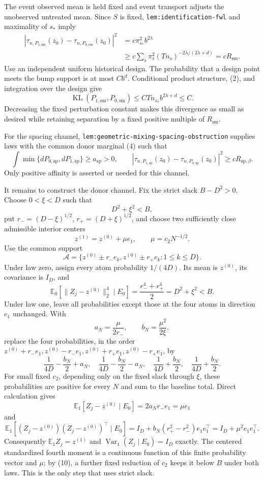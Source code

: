 The event observed mean is held fixed and event transport adjusts the unobserved untreated mean.  Since \(S\) is fixed, \texttt{lem:identification-fwl} and maximality of \(s_*\) imply
\[
\begin{aligned}
\left|\tau_{n,P_{1,\mathrm{sm}}}(z_0)-
\tau_{n,P_{0,\mathrm{sm}}}(z_0)\right|^2
&=c\pi_{s_*}^2b^{2\lambda}\\
&\geq c\sum_s\pi_s^2(Tn_s)^{-2\lambda/(2\lambda+d)}
=cR_{\mathrm{sm}}.
\end{aligned}
\tag{7}
\]
Use an independent uniform historical design.  The probability that a design point meets the bump support is at most \(Cb^d\).  Conditional product structure, (2), and integration over the design give
\[
\operatorname{KL}(P_{1,\mathrm{sm}},P_{0,\mathrm{sm}})
\leq CTn_{s_*}b^{2\lambda+d}\leq C.
\tag{8}
\]
Decreasing the fixed perturbation constant makes this divergence as small as desired while retaining separation by a fixed positive multiple of \(R_{\mathrm{sm}}\).

For the spacing channel, \texttt{lem:geometric-mixing-spacing-obstruction} supplies laws with the common donor marginal (4) such that
\[
\int\min\{dP_{0,\mathrm{sp}},dP_{1,\mathrm{sp}}\}
\geq a_{\mathrm{sp}}>0,
\qquad
\left|\tau_{n,P_{1,\mathrm{sp}}}(z_0)-
\tau_{n,P_{0,\mathrm{sp}}}(z_0)\right|^2
\geq cR_{\mathrm{sp},\beta}.
\tag{9}
\]
Only positive affinity is asserted or needed for this channel.

It remains to construct the donor channel.  Fix the strict slack \(B-D^2>0\).  Choose \(0<\xi<D\) such that
\[
D^2+\xi^2<B,
\]
put \(r_-=(D-\xi)^{1/2}\), \(r_+=(D+\xi)^{1/2}\), and choose two sufficiently close admissible interior centers
\[
z^{(1)}=z^{(0)}+\mu e_1,
\qquad
\mu=c_2N^{-1/2}.
\]
Use the common support
\[
\mathcal A=\{z^{(0)}\pm r_-e_k, z^{(0)}\pm r_+e_k:1\leq k\leq D\}.
\]
Under law zero, assign every atom probability \(1/(4D)\).  Its mean is \(z^{(0)}\), its covariance is \(I_D\), and
\[
\mathbb E_0[\|Z_j-z^{(0)}\|_2^4\mid E_0]
=\frac{r_-^4+r_+^4}{2}=D^2+\xi^2<B.
\tag{10}
\]
Under law one, leave all probabilities except those at the four atoms in direction \(e_1\) unchanged.  With
\[
a_N=\frac{\mu}{2r_-},
\qquad
b_N=\frac{\mu^2}{2\xi},
\]
replace the four probabilities, in the order
\(z^{(0)}+r_-e_1,z^{(0)}-r_-e_1,z^{(0)}+r_+e_1,z^{(0)}-r_+e_1\), by
\[
\frac1{4D}-\frac{b_N}{2}+a_N,
\quad
\frac1{4D}-\frac{b_N}{2}-a_N,
\quad
\frac1{4D}+\frac{b_N}{2},
\quad
\frac1{4D}+\frac{b_N}{2}.
\tag{11}
\]
For small fixed \(c_2\), depending only on the fixed slack through \(\xi\), these probabilities are positive for every \(N\) and sum to the baseline total.  Direct calculation gives
\[
\mathbb E_1[Z_j-z^{(0)}\mid E_0]=2a_Nr_-e_1=\mu e_1
\]
and
\[
\mathbb E_1[(Z_j-z^{(0)})(Z_j-z^{(0)})^\top\mid E_0]
=I_D+b_N(r_+^2-r_-^2)e_1e_1^\top
=I_D+\mu^2e_1e_1^\top.
\]
Consequently \(\mathbb E_1Z_j=z^{(1)}\) and
\(\operatorname{Var}_1(Z_j\mid E_0)=I_D\) exactly.  The centered standardized fourth moment is a continuous function of this finite probability vector and \(\mu\); by (10), a further fixed reduction of \(c_2\) keeps it below \(B\) under both laws.  This is the only step that uses strict slack.

